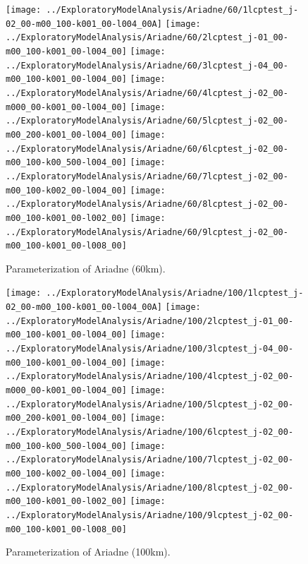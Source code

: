 \documentclass[12pt,a4paper]{thesis}
\begin{document}
\begin{appendices}
\begin{figure}[H]
\centering
\texttt{[image: ../ExploratoryModelAnalysis/Ariadne/60/1lcptest\_j-02\_00-m00\_100-k001\_00-l004\_00A]}
\texttt{[image: ../ExploratoryModelAnalysis/Ariadne/60/2lcptest\_j-01\_00-m00\_100-k001\_00-l004\_00]}
\texttt{[image: ../ExploratoryModelAnalysis/Ariadne/60/3lcptest\_j-04\_00-m00\_100-k001\_00-l004\_00]}
\texttt{[image: ../ExploratoryModelAnalysis/Ariadne/60/4lcptest\_j-02\_00-m000\_00-k001\_00-l004\_00]}
\texttt{[image: ../ExploratoryModelAnalysis/Ariadne/60/5lcptest\_j-02\_00-m00\_200-k001\_00-l004\_00]}
\texttt{[image: ../ExploratoryModelAnalysis/Ariadne/60/6lcptest\_j-02\_00-m00\_100-k00\_500-l004\_00]}
\texttt{[image: ../ExploratoryModelAnalysis/Ariadne/60/7lcptest\_j-02\_00-m00\_100-k002\_00-l004\_00]}
\texttt{[image: ../ExploratoryModelAnalysis/Ariadne/60/8lcptest\_j-02\_00-m00\_100-k001\_00-l002\_00]}
\texttt{[image: ../ExploratoryModelAnalysis/Ariadne/60/9lcptest\_j-02\_00-m00\_100-k001\_00-l008\_00]}
\caption{Parameterization of Ariadne (60km).}
\label{fig:60kmAll}
\end{figure}

\begin{figure}[H]
\centering
\texttt{[image: ../ExploratoryModelAnalysis/Ariadne/100/1lcptest\_j-02\_00-m00\_100-k001\_00-l004\_00A]}
\texttt{[image: ../ExploratoryModelAnalysis/Ariadne/100/2lcptest\_j-01\_00-m00\_100-k001\_00-l004\_00]}
\texttt{[image: ../ExploratoryModelAnalysis/Ariadne/100/3lcptest\_j-04\_00-m00\_100-k001\_00-l004\_00]}
\texttt{[image: ../ExploratoryModelAnalysis/Ariadne/100/4lcptest\_j-02\_00-m000\_00-k001\_00-l004\_00]}
\texttt{[image: ../ExploratoryModelAnalysis/Ariadne/100/5lcptest\_j-02\_00-m00\_200-k001\_00-l004\_00]}
\texttt{[image: ../ExploratoryModelAnalysis/Ariadne/100/6lcptest\_j-02\_00-m00\_100-k00\_500-l004\_00]}
\texttt{[image: ../ExploratoryModelAnalysis/Ariadne/100/7lcptest\_j-02\_00-m00\_100-k002\_00-l004\_00]}
\texttt{[image: ../ExploratoryModelAnalysis/Ariadne/100/8lcptest\_j-02\_00-m00\_100-k001\_00-l002\_00]}
\texttt{[image: ../ExploratoryModelAnalysis/Ariadne/100/9lcptest\_j-02\_00-m00\_100-k001\_00-l008\_00]}
\caption{Parameterization of Ariadne (100km).}
\label{fig:100kmAll}
\end{figure}

\newpage


\end{appendices}
\end{document}
